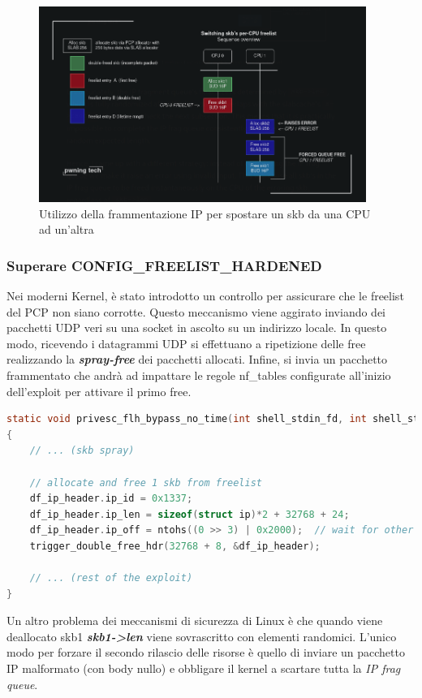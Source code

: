 \documentclass{article}
\begin{document}
\begin{figure}[h]
  \begin{center}
    \includegraphics[width=0.95\textwidth]{figures/ch1/switching_skb_cpu-1.png}
  \end{center}
  \caption{Utilizzo della frammentazione IP per spostare un skb da una CPU ad un'altra}\label{fig:skb-migr}
\end{figure}

\subsubsection{Superare CONFIG\_FREELIST\_HARDENED} Nei moderni Kernel, è stato introdotto 
un controllo per assicurare che le freelist del PCP non siano corrotte. Questo meccanismo 
viene aggirato inviando dei pacchetti UDP veri su una socket in ascolto su un indirizzo locale. 
In questo modo, ricevendo i datagrammi UDP si effettuano a ripetizione delle free realizzando 
la \textbf{\textit{spray-free}} dei pacchetti allocati. Infine, si invia un pacchetto frammentato 
che andrà ad impattare le regole nf\_tables configurate all'inizio dell'exploit per attivare 
il primo free.

\begin{lstlisting}[language=C,caption="Trigger del primo free con un pacchetto frammentato (0x2000)"]
static void privesc_flh_bypass_no_time(int shell_stdin_fd, int shell_stdout_fd)
{
    // ... (skb spray)

    // allocate and free 1 skb from freelist
	df_ip_header.ip_id = 0x1337;
	df_ip_header.ip_len = sizeof(struct ip)*2 + 32768 + 24;
	df_ip_header.ip_off = ntohs((0 >> 3) | 0x2000);  // wait for other fragments. 8 >> 3 to make it wait or so?
	trigger_double_free_hdr(32768 + 8, &df_ip_header);

    // ... (rest of the exploit)
} 
\end{lstlisting}
Un altro problema dei meccanismi di sicurezza di Linux è che quando viene deallocato skb1 
\textbf{\textit{skb1->len}} viene sovrascritto con elementi randomici. L'unico modo per forzare 
il secondo rilascio delle risorse è quello di inviare un pacchetto IP malformato (con body nullo) 
e obbligare il kernel a scartare tutta la \textit{IP frag queue}.
\end{document}
